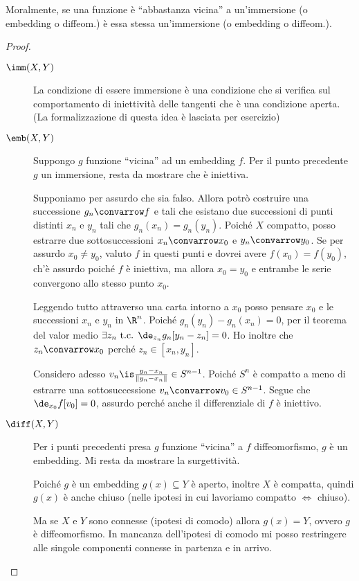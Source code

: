 Moralmente, se una funzione è ``abbastanza vicina'' a un'immersione (o embedding o diffeom.) è essa stessa un'immersione (o embedding o diffeom.).
\begin{proof}
\noindent
\begin{description}
\item [$\imm(X,Y)$] La condizione di essere immersione è una condizione che si verifica sul comportamento di iniettività delle tangenti che è una condizione aperta. (La formalizzazione di questa idea è lasciata per esercizio)
\item [$\emb(X,Y)$] Suppongo $g$ funzione ``vicina'' ad un embedding $f$. Per il punto precedente $g$ un immersione, resta da mostrare che è iniettiva. 

Supponiamo per assurdo che sia falso. Allora potrò costruire una successione $g_n \convarrow f$ e tali che esistano due successioni di punti distinti $x_n$ e $y_n$ tali che $g_n(x_n) = g_n(y_n)$. 
Poiché $X$ compatto, posso estrarre due sottosuccessioni $x_n \convarrow x_0$ e $y_n \convarrow y_0$. Se per assurdo $x_0 \neq y_0$, valuto $f$ in questi punti e dovrei avere $f(x_0)=f(y_0)$, ch'è assurdo poiché $f$ è iniettiva, ma allora $x_0=y_0$ e entrambe le serie convergono allo stesso punto $x_0$.

Leggendo tutto attraverso una carta intorno a $x_0$ posso pensare $x_0$ e le successioni $x_n$ e $y_n$ in $\R^n$.
Poiché $g_n(y_n)-g_n(x_n)=0$, per il teorema del valor medio $\exists z_n \text{ t.c. } \de_{z_n}g_n[y_n-z_n]=0$.
Ho inoltre che $z_n \convarrow x_0$ perché $z_n \in [x_n,y_n]$.

Considero adesso $v_n \is \frac{y_n-x_n}{\left \|y_n - x_n \right \|} \in S^{n-1}$. Poiché $S^n$ è compatto a meno di estrarre una sottosuccessione $v_n \convarrow v_0 \in S^{n-1}$.
Segue che $\de_{x_0}f[v_0]=0$,
assurdo perché anche il differenziale di $f$ è iniettivo. \absurd
\item [$\diff(X,Y)$] Per i punti precedenti presa $g$ funzione ``vicina'' a $f$ diffeomorfismo, $g$ è un embedding. Mi resta da mostrare la surgettività.

Poiché $g$ è un embedding $g(x) \subseteq Y$ è aperto, inoltre $X$ è compatta, quindi $g(x)$ è anche chiuso (nelle ipotesi in cui lavoriamo compatto $\iff$ chiuso).

Ma se $X$ e $Y$ sono connesse (ipotesi di comodo) allora $g(x) = Y$, ovvero $g$ è diffeomorfismo. In mancanza dell'ipotesi di comodo mi posso restringere alle singole componenti connesse in partenza e in arrivo.
\qedhere
\end{description}
\end{proof}

